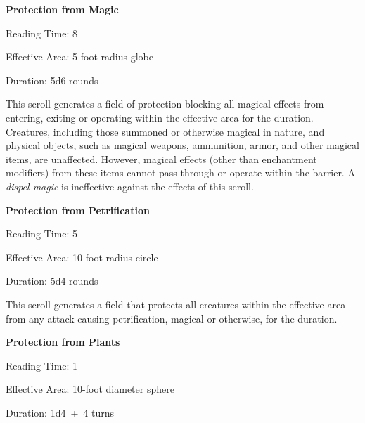 \begin{multicols}{2}
\vspace{1em}
\noindent \begin{minipage}{\columnwidth}

\noindent \textbf{Protection from Magic}

\noindent Reading Time: 8

\noindent Effective Area: 5-foot radius globe

\noindent Duration: 5d6 rounds

\end{minipage}

This scroll generates a field of protection blocking all magical effects from entering, exiting or operating within the effective area for the duration.  Creatures, including those summoned or otherwise magical in nature, and physical objects, such as magical weapons, ammunition, armor, and other magical items, are unaffected.  However, magical effects (other than enchantment modifiers) from these items cannot pass through or operate within the barrier. A \textit{dispel magic} is ineffective against the effects of this scroll.

\vspace{1em}
\noindent \begin{minipage}{\columnwidth}

\noindent \textbf{Protection from Petrification}

\noindent Reading Time: 5

\noindent Effective Area: 10-foot radius circle

\noindent Duration: 5d4 rounds

\end{minipage}

This scroll generates a field that protects all creatures within the effective area from any attack causing petrification, magical or otherwise, for the duration.

\vspace{1em}
\noindent \begin{minipage}{\columnwidth}

\noindent \textbf{Protection from Plants}

\noindent Reading Time: 1

\noindent Effective Area: 10-foot diameter sphere

\noindent Duration: 1d4~+~4 turns

\end{minipage}


\end{multicols}
